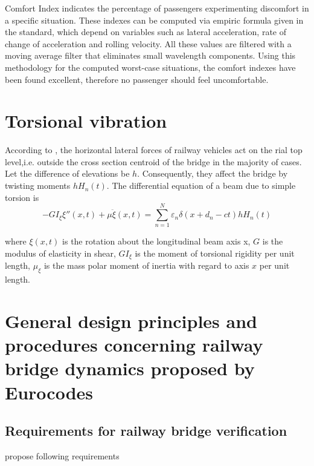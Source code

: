 Comfort Index indicates the percentage of passengers experimenting discomfort in a specific situation. These indexes can be computed via empiric formula given in the standard, which depend on variables such as lateral acceleration, rate of change of acceleration and rolling velocity. All these values are filtered with a moving average filter that eliminates small wavelength components. Using this methodology for the computed worst-case situations, the comfort indexes have been found excellent, therefore no passenger should feel uncomfortable. 

\section{Torsional vibration}
According to \cite[9.1.3]{fryba1996dynamics}, the horizontal lateral forces of railway vehicles act on the rial top level,i.e. outside the cross section centroid of the bridge in the majority of cases. Let the difference of elevations be $ h $. Consequently, they affect the bridge by twisting moments $ hH_n(t) $. The differential equation of a beam due to simple torsion is 
\begin{equation}
	-GI_\xi \xi''(x,t)+\mu \ddot{\xi}(x,t)=\sum_{n=1}^{N}\varepsilon_n \delta (x+d_n-ct)h H_n(t)
\end{equation}

where $ \xi (x,t) $ is the rotation about the longitudinal beam axis x, $ G $ is the modulus of elasticity in shear, $ GI_\xi $ is the moment of torsional rigidity per unit length, $ \mu_\xi $ is the mass polar moment of inertia with regard to axis $ x $ per unit length.

\section{General design principles and procedures concerning railway bridge dynamics proposed by Eurocodes }


\subsection{Requirements for railway bridge verification}
\cite{EC0} propose following requirements


